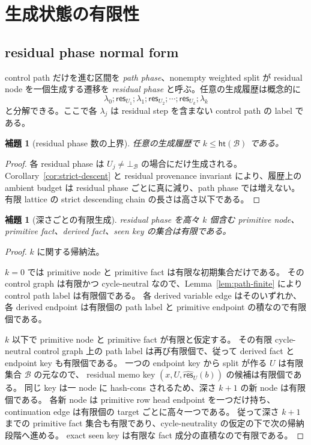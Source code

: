 \documentclass[uplatex,dvipdfmx,a4paper,10.5pt]{jsarticle}
\theoremstyle{jpplain}
\newtheorem{lemma}[definition]{補題}
\newcommand{\Caps}{\mathcal B}
\newcommand{\botc}{\bot_{\Caps}}
\newcommand{\res}{\mathsf{res}}
\newcommand{\respair}{\widehat{\mathsf{res}}}
\newcommand{\capheight}{\mathsf{ht}}
\begin{document}
\section{生成状態の有限性}

\subsection{residual phase normal form}

control path だけを進む区間を \emph{path phase}、nonempty weighted split が residual node を一個生成する遷移を
\emph{residual phase} と呼ぶ。任意の生成履歴は概念的に
\[
  \lambda_0;\res_{U_1};\lambda_1;\res_{U_2};\cdots;
  \res_{U_k};\lambda_k
\]
と分解できる。ここで各 $\lambda_j$ は residual step を含まない control path の label である。

\begin{lemma}[residual phase 数の上界]
任意の生成履歴で $k\leq\capheight(\Caps)$ である。
\end{lemma}

\begin{proof}
各 residual phase は $U_j\neq\botc$ の場合にだけ生成される。
Corollary~\ref{cor:strict-descent} と residual provenance invariant により、履歴上の ambient budget は
residual phase ごとに真に減り、path phase では増えない。
有限 lattice の strict descending chain の長さは高さ以下である。
\end{proof}

\begin{lemma}[深さごとの有限生成]
\label{lem:finite-by-depth}
residual phase を高々 $k$ 個含む primitive node、primitive fact、derived fact、seen key の集合は有限である。
\end{lemma}

\begin{proof}
$k$ に関する帰納法。

$k=0$ では primitive node と primitive fact は有限な初期集合だけである。
その control graph は有限かつ cycle-neutral なので、Lemma~\ref{lem:path-finite} により control path label は有限個である。
各 derived variable edge はそのいずれか、各 derived endpoint は有限個の path label と primitive endpoint の積なので有限個である。

$k$ 以下で primitive node と primitive fact が有限と仮定する。
その有限 cycle-neutral control graph 上の path label は再び有限個で、従って derived fact と endpoint key も有限個である。
一つの endpoint key から split が作る $U$ は有限集合 $\Caps$ の元なので、
residual memo key $(x,U,\respair_U(b))$ の候補は有限個である。
同じ key は一 node に hash-cons されるため、深さ $k+1$ の新 node は有限個である。
各新 node は primitive row head endpoint を一つだけ持ち、continuation edge は有限個の target ごとに高々一つである。
従って深さ $k+1$ までの primitive fact 集合も有限であり、cycle-neutrality の仮定の下で次の帰納段階へ進める。
exact seen key は有限な fact 成分の直積なので有限である。
\end{proof}
\end{document}
